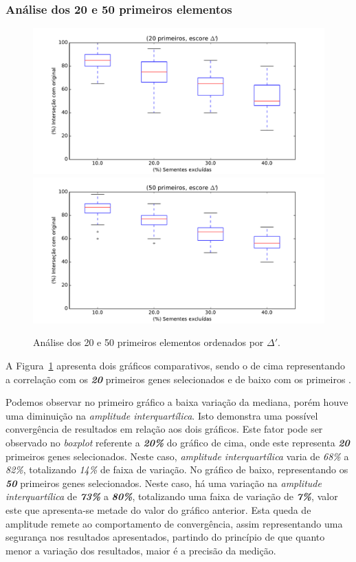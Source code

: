 \subsubsection{Análise dos 20 e 50 primeiros elementos}
\begin{figure}[ht!]
\includegraphics[width=1\textwidth]{Images/analyses/fig_S_20_40.pdf}
\includegraphics[width=1\textwidth]{Images/analyses/fig_S_50_40.pdf}
\caption {Análise dos 20 e 50 primeiros elementos ordenados por $\Delta'$.
\label{fig_S_20-50_40}}
\end{figure}
%

A Figura~\ref{fig_S_20-50_40} apresenta dois gráficos comparativos, sendo o de cima representando a correlação com os \textsl{\textbf{20}} primeiros genes selecionados e de baixo com os primeiros . 
%

Podemos observar no primeiro gráfico a baixa variação da mediana, porém houve uma diminuição na \textit{amplitude interquartílica}. Isto demonstra uma possível convergência de resultados em relação aos dois gráficos. Este fator pode ser observado no \textit{boxplot} referente a \textbf{\textsl{20\%}} do gráfico de cima, onde este representa \textsl{\textbf{20}} primeiros genes selecionados. Neste caso, \textit{amplitude interquartílica} varia de \textit{68\%} a \textit{82\%}, totalizando \textit{14\%} de faixa de variação. No gráfico de baixo, representando os \textbf{\textit{50}} primeiros genes selecionados. Neste caso, há uma variação na \textsl{amplitude interquartílica} de \textbf{\textsl{73\%}} a \textbf{\textsl{80\%}}, totalizando uma faixa de variação de \textbf{\textsl{7\%}}, valor este que apresenta-se metade do valor do gráfico anterior. Esta queda de amplitude remete ao comportamento de convergência, assim representando uma segurança nos resultados apresentados, partindo do princípio de que quanto menor a variação dos resultados, maior é a precisão da medição.
%

